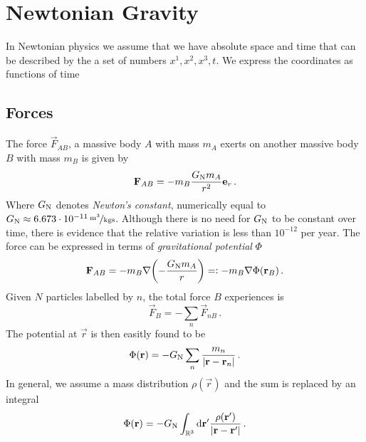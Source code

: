 \chapter{Newtonian Gravity}
In Newtonian physics we assume that we have absolute space and time that can be described by the a set of numbers $x^1,x^2,x^3,t$. We express the coordinates as functions of time
\section{Forces}
The force $\vec{F}_{AB}$, a massive body $A$ with mass $m_A$ exerts on another massive body $B$ with mass $m_B$ is given by
\begin{equation}
    \vec{F}_{AB}=-m_B\frac{G\textsubscript{N}m_A}{r^2}\vec{e}_r\, .
\end{equation}
Where $G\textsubscript{N}$ denotes \emph{Newton's constant}, numerically equal
to $G\textsubscript{N}\approx \unitfrac[6.673\cdot 10^{-11}]{m^3}{kgs}$. 
Although there is no need for $G\textsubscript{N}$ to be constant over time, 
there is evidence that the relative variation is less than $10^{-12}$ per year. 
The force can be expressed in terms of \emph{gravitational potential} $\Phi$
\begin{equation}
    \vec{F}_{AB}=-m_B\nabla\left(-\frac{G\textsubscript{N}m_A}{r}\right)=:
    -m_B\nabla\Phi(\vec{r}_B)\, .
\end{equation}
Given $N$ particles labelled by $n$, the total force $B$ experiences is
\begin{equation}
    \vec{F}_{B}=-\sum_n \vec{F}_{nB}\, .
\end{equation}
The potential at $\vec{r}$ is then easitly found to be
\begin{equation}
    \Phi(\vec{r})=-G\textsubscript{N}\sum_n\frac{m_n}{|\vec{r}-\vec{r}_n|}\, .
\end{equation}
In general, we assume a mass distribution $\rho(\vec{r})$ and the sum is
replaced by an integral
\begin{equation}
    \Phi(\vec{r})=-G\textsubscript{N}\int_{\Reals^3}\dif{\vec{r}^{\prime}}\frac{\rho(\vec{r}^{\prime})}{|\vec{r}-\vec{r}^{\prime}|}\,
    .\end{equation}
